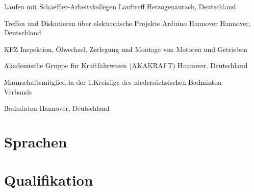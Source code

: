 \documentclass[11pt,a4paper,sans]{moderncv}
\begin{document}
{
Laufen mit Schaeffler-Arbeitskollegen
}
{Lauftreff}
{Herzogenaurach, Deutschland}
{}
{}

{
Treffen und Diskutieren über elektronische Projekte
}
{Arduino Hannover}
{Hannover, Deutschland}
{}
{}

{
\parbox[t]{12cm}{KFZ Inspektion, Ölwechsel, Zerlegung und Montage von Motoren und Getrieben}
}
{Akademische Gruppe für Kraftfahrwesen (AKAKRAFT)}
{Hannover, Deutschland}
{}
{}

{
\parbox[t]{10cm}{Mannschaftsmitglied in der 1.Kreisliga des niedersächsischen Badminton-Verbands}
}
{Badminton}
{Hannover, Deutschland}
{}
{}

\section{\textbf{Sprachen}}

\section{\textbf{Qualifikation}}
\end{document}
